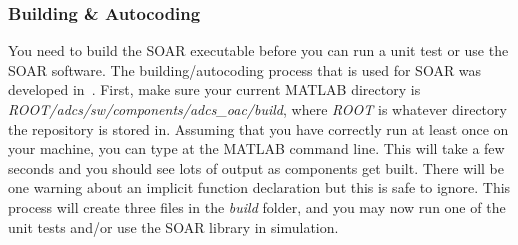 \documentclass[10pt]{article}
\begin{document}

\subsubsection{Building \& Autocoding}\label{sec2:build_autocode}

You need to build the SOAR executable before you can run a unit test or use the SOAR software. The building/autocoding process that is used for SOAR was developed in~\cite{MalyutaThesis}. First, make sure your current MATLAB directory is \textit{ROOT/adcs/sw/components/adcs\_oac/build}, where \textit{ROOT} is whatever directory the repository is stored in. Assuming that you have correctly run  at least once on your machine, you can type  at the MATLAB command line. This will take a few seconds and you should see lots of output as components get built. There will be one warning about an implicit function declaration but this is safe to ignore. This process will create three files in the \textit{build} folder, and you may now run one of the unit tests and/or use the SOAR library in simulation.  
\end{document}
